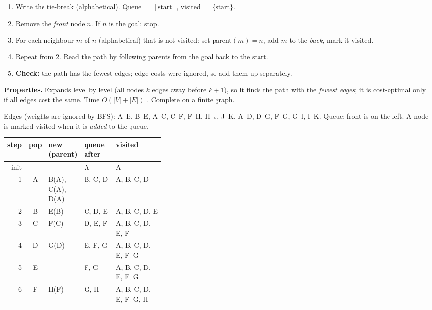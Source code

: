 \begin{multicols}{2}
\label{w12:bfs}
\begin{recipe}
\begin{enumerate}
\item Write the tie-break (alphabetical). Queue $=[\text{start}]$, visited $=\{\text{start}\}$.
\item Remove the \emph{front} node $n$. If $n$ is the goal: stop.
\item For each neighbour $m$ of $n$ (alphabetical) that is not visited: set parent$(m)=n$, add $m$ to the \emph{back}, mark it visited.
\item Repeat from 2. Read the path by following parents from the goal back to the start.
\item \textbf{Check:} the path has the fewest edges; edge costs were ignored, so add them up separately.
\end{enumerate}
\end{recipe}
\textbf{Properties.} Expands level by level (all nodes $k$ edges away before $k{+}1$), so it finds the path with the \emph{fewest edges}; it is cost-optimal only if all edges cost the same. Time $O(|V|+|E|)$ . Complete on a finite graph.
\begin{worked}
Edges (weights are ignored by BFS): A--B, B--E, A--C, C--F, F--H, H--J, J--K, A--D, D--G, F--G, G--I, I--K. Queue: front is on the left. A node is marked visited when it is \emph{added} to the queue.\par\vspace{2pt}
\scriptsize\setlength{\tabcolsep}{2.5pt}
\begin{tabularx}{\linewidth}{@{}rc>{\raggedright\arraybackslash}p{0.17\linewidth}>{\raggedright\arraybackslash}p{0.2\linewidth}X@{}}\toprule
step & pop & new (parent) & queue after & visited\\\midrule
init & -- & -- & A & A\\
1 & A & B(A), C(A), D(A) & B, C, D & A, B, C, D\\
2 & B & E(B) & C, D, E & A, B, C, D, E\\
3 & C & F(C) & D, E, F & A, B, C, D, E, F\\
4 & D & G(D) & E, F, G & A, B, C, D, E, F, G\\
5 & E & -- & F, G & A, B, C, D, E, F, G\\
6 & F & H(F) & G, H & A, B, C, D, E, F, G, H\\

\end{tabularx}
\end{worked}
\end{multicols}
